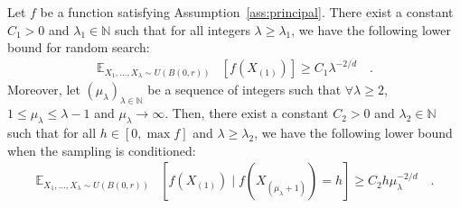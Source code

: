 \begin{lemma}\label{lem:lower1best}
Let $f$ be a function satisfying Assumption~\ref{ass:principal}. There exist a constant $C_1>0$ and $\lambda_1\in \mathbb{N}$ such that for all integers $\lambda\geq \lambda_1$, we have the following lower bound for random search:
\begin{align*}
\mathbb{E}_{X_1,\dots,X_\lambda\sim U(B(0,r))}&\left[ f\left(X_{(1)}\right)\right]\geq C_1 \lambda^{-2/d}\quad.
\end{align*}
Moreover, let $(\mu_\lambda)_{\lambda\in\mathbb{N}}$ be a sequence of integers such that $\forall\lambda\geq 2$, $1\leq \mu_\lambda \leq \lambda -1$ and $\mu_\lambda\to\infty$. Then, there exist a constant $C_2>0$ and $\lambda_2\in \mathbb{N}$ such that for all $h\in [0,\max f]$ and $\lambda\geq\lambda_2$, we have the following lower bound when the sampling is conditioned: 
\begin{align*}
   \mathbb{E}_{X_1,\dots,X_\lambda\sim U(B(0,r))}&\left[ f\left(X_{(1)}\right)\mid f(X_{(\mu_{\lambda}+1)})= h\right] \geq C_2 h\mu_\lambda^{-2/d}\quad.
\end{align*}
\end{lemma}
